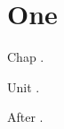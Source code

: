 \chapter{One}
Chap \cite{zeta}.
\begin{bibunit}[plain]
Unit \cite{mid}.
\end{bibunit}
After \cite{Smith2020}.


